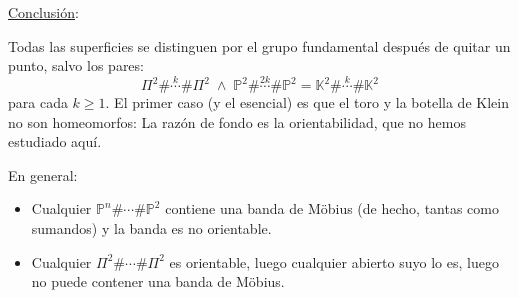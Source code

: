 \underline{Conclusión}:

Todas las superficies se distinguen por el grupo fundamental después de quitar un punto, salvo los pares:
\[
\Pi^2 \# \stackrel{k}{\cdots} \# \Pi^2\; \land \;\mathbb{P}^{2} \# \stackrel{2k}{\cdots} \# \mathbb{P}^{2} = \mathbb{K}^2 \# \stackrel{k}{\cdots} \# \mathbb{K}^2
\]
para cada $k \ge 1$. El primer caso (y el esencial) es que el toro y la botella de Klein no son homeomorfos: La razón de fondo es la orientabilidad, que no hemos estudiado aquí.

En general:
\begin{itemize}
    \item Cualquier $\mathbb{P}^{n} \# \cdots \# \mathbb{P}^{2}$ contiene una banda de Möbius (de hecho, tantas como sumandos) y la banda es no orientable.
    \item Cualquier $\Pi^2 \# \cdots \# \Pi^2$ es orientable, luego cualquier abierto suyo lo es, luego no puede contener una banda de Möbius.
\end{itemize}


